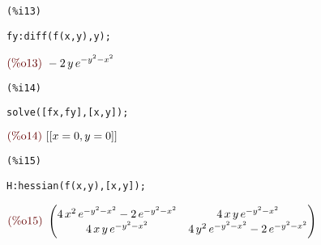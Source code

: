\documentclass[12pt]{article}
\begin{document}
\noindent
\begin{minipage}[t]{8ex}{\color{red}\bf
\begin{verbatim}
(%i13) 
\end{verbatim}}
\end{minipage}
\begin{minipage}[t]{\textwidth}{\color{blue}
\begin{verbatim}
fy:diff(f(x,y),y);
\end{verbatim}}
\end{minipage}
\begin{math}\displaystyle
\parbox{8ex}{\color{labelcolor}(\%o13) }
-2\,y\,{e}^{-{y}^{2}-{x}^{2}}
\end{math}


\noindent
\begin{minipage}[t]{8ex}{\color{red}\bf
\begin{verbatim}
(%i14) 
\end{verbatim}}
\end{minipage}
\begin{minipage}[t]{\textwidth}{\color{blue}
\begin{verbatim}
solve([fx,fy],[x,y]);
\end{verbatim}}
\end{minipage}
\begin{math}\displaystyle
\parbox{8ex}{\color{labelcolor}(\%o14) }
[[x=0,y=0]]
\end{math}


\noindent
\begin{minipage}[t]{8ex}{\color{red}\bf
\begin{verbatim}
(%i15) 
\end{verbatim}}
\end{minipage}
\begin{minipage}[t]{\textwidth}{\color{blue}
\begin{verbatim}
H:hessian(f(x,y),[x,y]);
\end{verbatim}}
\end{minipage}
\begin{math}\displaystyle
\parbox{8ex}{\color{labelcolor}(\%o15) }
\begin{pmatrix}4\,{x}^{2}\,{e}^{-{y}^{2}-{x}^{2}}-2\,{e}^{-{y}^{2}-{x}^{2}} & 4\,x\,y\,{e}^{-{y}^{2}-{x}^{2}}\cr 4\,x\,y\,{e}^{-{y}^{2}-{x}^{2}} & 4\,{y}^{2}\,{e}^{-{y}^{2}-{x}^{2}}-2\,{e}^{-{y}^{2}-{x}^{2}}\end{pmatrix}
\end{math}
\end{document}
